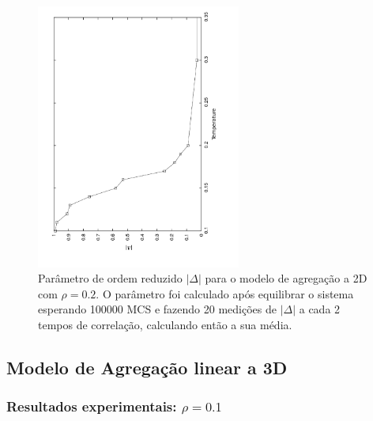 \documentclass[11pt]{beamer}
\begin{document}
\begin{frame}
\frametitle{\insertsection \\ {\small \insertsubsection}}
\begin{figure}
	\centering
		\includegraphics[angle=-90, clip, trim = 1cm 2cm 1cm 1cm, width=0.6\textwidth]{images/delta2d}
	\caption{{\footnotesize Parâmetro de ordem reduzido $|\Delta|$ para o modelo de agregação a 2D com $\rho = 0.2$. O parâmetro foi calculado após equilibrar o sistema esperando 100000 MCS e fazendo 20 medições de $|\Delta|$ a cada 2 tempos de correlação, calculando então a sua média.}}
	\label{fig:6}
\end{figure}
\end{frame}

\subsection{Modelo de Agregação linear a 3D}
\subsubsection{Resultados experimentais: $\rho=0.1$}
\end{document}
